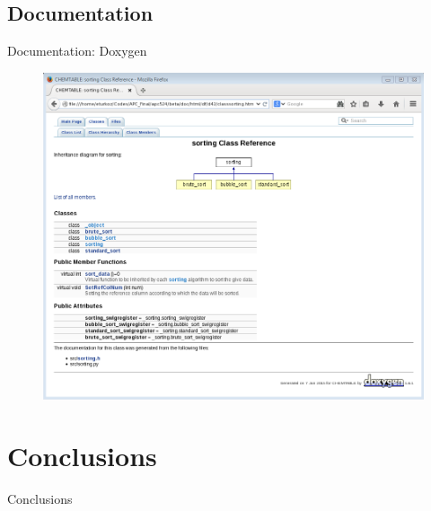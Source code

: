 \documentclass{beamer}
\begin{document}

\subsection{Documentation}
\begin{frame}{Documentation: Doxygen}
\begin{figure}
\includegraphics[scale=0.35]{doxygen.png}
\end{figure}

\end{frame}


\section{Conclusions}

\begin{frame}{Conclusions}


\end{frame}
\end{document}
